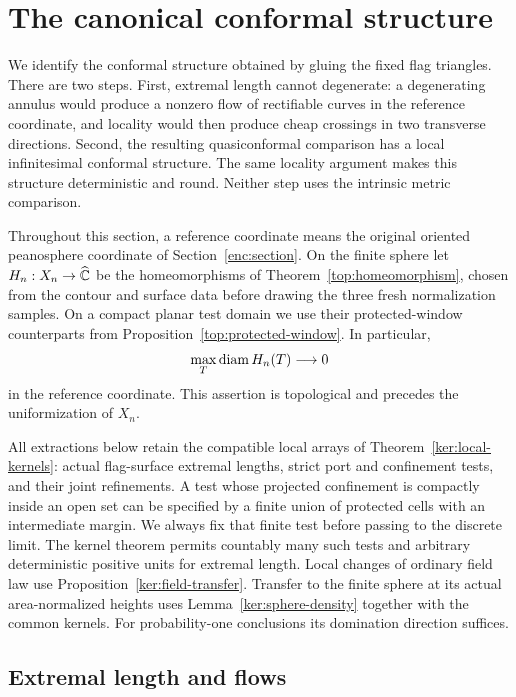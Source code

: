 \section{The canonical conformal structure}
\label{conf:section}

We identify the conformal structure obtained by gluing the fixed flag
triangles.  There are two steps.  First, extremal length cannot degenerate:
a degenerating annulus would produce a nonzero flow of rectifiable curves
in the reference coordinate, and locality would then produce cheap
crossings in two transverse directions.  Second, the resulting
quasiconformal comparison has a local infinitesimal conformal structure.
The same locality argument makes this structure deterministic and round.
Neither step uses the intrinsic metric comparison.

Throughout this section, a reference coordinate means the original
oriented peanosphere coordinate of Section~\ref{enc:section}.  On the
finite sphere let
\(H_n:X_n\to\widehat{\mathbb C}\) be the homeomorphisms of
Theorem~\ref{top:homeomorphism}, chosen from the contour and surface
data before drawing the three fresh normalization samples.  On a compact
planar test domain we use their protected-window counterparts from
Proposition~\ref{top:protected-window}.  In particular,
\begin{equation}
 \max_T\diam H_n(T)\longrightarrow0
 \label{conf:topological-mesh}
\end{equation}
in the reference coordinate.  This assertion is topological and precedes
the uniformization of \(X_n\).

All extractions below retain the compatible local arrays of
Theorem~\ref{ker:local-kernels}: actual flag-surface extremal lengths,
strict port and confinement tests, and their joint refinements.  A test
whose projected confinement is compactly inside an open set can be
specified by a finite union of protected cells with an intermediate
margin.  We always fix that finite test before passing to the discrete
limit.  The kernel theorem permits countably many such tests and
arbitrary deterministic positive units for extremal length.  Local
changes of ordinary field law use Proposition~\ref{ker:field-transfer}.
Transfer to the finite sphere at its actual area-normalized heights uses
Lemma~\ref{ker:sphere-density} together with the common kernels. For
probability-one conclusions its domination direction suffices.

\subsection{Extremal length and flows}
\label{conf:el-preliminaries}

